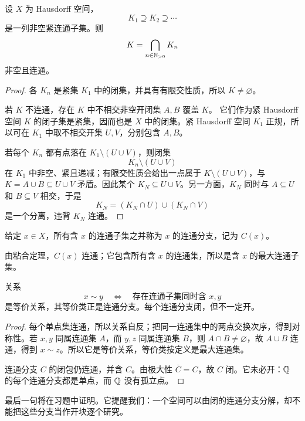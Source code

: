 \begin{theorem}[递减紧连通集的交]
\label{thm:nested-compact-connected-intersection}
设 \(X\) 为 Hausdorff 空间，
\[
 K_1\supseteq K_2\supseteq\cdots
\]
是一列非空紧连通子集。则
\[
 K=\bigcap_{n\in\mathbb{N}_{>0}}K_n
\]
非空且连通。
\end{theorem}

\begin{proof}
各 \(K_n\) 是紧集 \(K_1\) 中的闭集，并具有有限交性质，所以
\(K\ne\varnothing\)。

若 \(K\) 不连通，存在 \(K\) 中不相交非空开闭集 \(A,B\) 覆盖 \(K\)。
它们作为紧 Hausdorff 空间 \(K\) 的闭子集是紧集，因而也是 \(X\) 中的闭集。紧 Hausdorff 空间 \(K_1\) 正规，所以可在 \(K_1\) 中取不相交开集 \(U,V\)，分别包含 \(A,B\)。

若每个 \(K_n\) 都有点落在 \(K_1\setminus(U\cup V)\)，则闭集
\[
 K_n\setminus(U\cup V)
\]
在 \(K_1\) 中非空、紧且递减；有限交性质会给出一点属于
\(K\setminus(U\cup V)\)，与 \(K=A\cup B\subseteq U\cup V\) 矛盾。因此某个 \(K_N\subseteq U\cup V\)。另一方面，\(K_N\) 同时与
\(A\subseteq U\) 和 \(B\subseteq V\) 相交，于是
\[
 K_N=(K_N\cap U)\cup(K_N\cap V)
\]
是一个分离，违背 \(K_N\) 连通。
\end{proof}

\begin{definition}[连通分支]
给定 \(x\in X\)，所有含 \(x\) 的连通子集之并称为 \(x\) 的连通分支，记为 \(C(x)\)。
\end{definition}

由粘合定理，\(C(x)\) 连通；它包含所有含 \(x\) 的连通集，所以是含 \(x\) 的最大连通子集。

\begin{proposition}[连通分支的结构]
\label{prop:connected-components}
关系
\[
 x\sim y\quad\Longleftrightarrow\quad
 \text{存在连通子集同时含 }x,y
\]
是等价关系，其等价类正是连通分支。每个连通分支闭，但不一定开。
\end{proposition}

\begin{proof}
每个单点集连通，所以关系自反；把同一连通集中的两点交换次序，得到对称性。若 \(x,y\) 同属连通集 \(A\)，而 \(y,z\) 同属连通集 \(B\)，则 \(A\cap B\ne\varnothing\)，故 \(A\cup B\) 连通，得到 \(x\sim z\)。所以它是等价关系，等价类按定义是最大连通集。

连通分支 \(C\) 的闭包仍连通，并含 \(C\)。由极大性 \(\overline C=C\)，故 \(C\) 闭。它未必开：\(\mathbb{Q}\) 的每个连通分支都是单点，而 \(\mathbb{Q}\) 没有孤立点。
\end{proof}

最后一句将在习题中证明。它提醒我们：一个空间可以由闭的连通分支分解，却不能把这些分支当作开块逐个研究。

